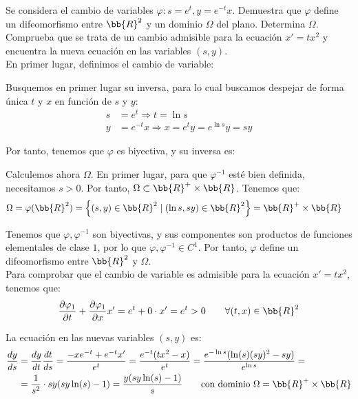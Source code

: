 \documentclass[12pt]{article}
\begin{document}
    \begin{ejercicio}
        Se considera el cambio de variables $\varphi : s = e^t, y = e^{-t}x$. Demuestra que $\varphi$ define un difeomorfismo entre $\bb{R}^2$ y un dominio $\Omega$ del plano.
        Determina $\Omega$.
        Comprueba que se trata de un cambio admisible para la ecuación $x' = tx^2$ y encuentra la nueva ecuación en las variables $(s,y)$.\\

        En primer lugar, definimos el cambio de variable:

        Busquemos en primer lugar su inversa, para lo cual buscamos despejar de forma única $t$ y $x$ en función de $s$ y $y$:
        \begin{align*}
            s &= e^t \Longrightarrow t = \ln s\\
            y &= e^{-t}x \Longrightarrow x= e^ty = e^{\ln s}y = sy
        \end{align*}

        Por tanto, tenemos que $\varphi$ es biyectiva, y su inversa es:

        Calculemos ahora $\Omega$. En primer lugar, para que $\varphi^{-1}$ esté bien definida, necesitamos $s>0$. Por tanto, $\Omega\subset \bb{R}^+\times \bb{R}$. Tenemos que:
        \begin{align*}
            \Omega &= \varphi(\bb{R}^2) = \left\{(s,y)\in \bb{R}^2 \mid \left(\ln s, sy\right)\in \bb{R}^2\right\} = \bb{R}^+\times \bb{R}
        \end{align*}
        
        Tenemos que $\varphi,\varphi^{-1}$ son biyectivas, y sus componentes son productos de funciones elementales de clase $1$, por lo que $\varphi,\varphi^{-1}\in C^1$. Por tanto, $\varphi$ define un difeomorfismo entre $\bb{R}^2$ y $\Omega$.\\

        Para comprobar que el cambio de variable es admisible para la ecuación $x'=tx^2$, tenemos que:
        \begin{align*}
            \dfrac{\partial \varphi_1}{\partial t} + \dfrac{\partial \varphi_1}{\partial x}x' 
            = e^t + 0\cdot x' = e^t > 0 \qquad \forall (t,x)\in \bb{R}^2
        \end{align*}

        La ecuación en las nuevas variables $(s,y)$ es:
        \begin{align*}
            \dfrac{dy}{ds} &= \dfrac{dy}{dt}\dfrac{dt}{ds} = \dfrac{-xe^{-t} + e^{-t}x'}{e^t} =\dfrac{e^{-t}(tx^2-x)}{e^t}
            = \dfrac{e^{-\ln s}(\ln (s)(sy)^2-sy)}{e^{\ln s}} =\\&= \dfrac{1}{s^2}\cdot sy(sy\ln (s)-1) = \dfrac{y(sy\ln (s)-1)}{s}
            \qquad \text{con dominio } \Omega = \bb{R}^+\times \bb{R}
        \end{align*}

    \end{ejercicio}
\end{document}
